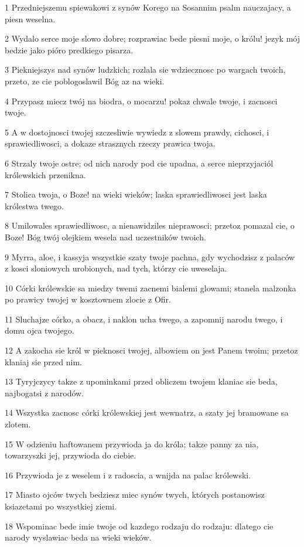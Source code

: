 \par 1 Przedniejszemu spiewakowi z synów Korego na Sosannim psalm nauczajacy, a piesn weselna.
\par 2 Wydalo serce moje slowo dobre; rozprawiac bede piesni moje, o królu! jezyk mój bedzie jako pióro predkiego pisarza.
\par 3 Piekniejszys nad synów ludzkich; rozlala sie wdziecznosc po wargach twoich, przeto, ze cie poblogoslawil Bóg az na wieki.
\par 4 Przypasz miecz twój na biodra, o mocarzu! pokaz chwale twoje, i zacnosci twoje.
\par 5 A w dostojnosci twojej szczesliwie wywiedz z slowem prawdy, cichosci, i sprawiedliwosci, a dokaze strasznych rzeczy prawica twoja.
\par 6 Strzaly twoje ostre; od nich narody pod cie upadna, a serce nieprzyjaciól królewskich przenikna.
\par 7 Stolica twoja, o Boze! na wieki wieków; laska sprawiedliwosci jest laska królestwa twego.
\par 8 Umilowales sprawiedliwosc, a nienawidziles nieprawosci; przetoz pomazal cie, o Boze! Bóg twój olejkiem wesela nad uczestników twoich.
\par 9 Myrra, aloe, i kassyja wszystkie szaty twoje pachna, gdy wychodzisz z palaców z kosci sloniowych urobionych, nad tych, którzy cie uweselaja.
\par 10 Córki królewskie sa miedzy twemi zacnemi bialemi glowami; stanela malzonka po prawicy twojej w kosztownem zlocie z Ofir.
\par 11 Sluchajze córko, a obacz, i naklon ucha twego, a zapomnij narodu twego, i domu ojca twojego.
\par 12 A zakocha sie król w pieknosci twojej, albowiem on jest Panem twoim; przetoz klaniaj sie przed nim.
\par 13 Tyryjczycy takze z upominkami przed obliczem twojem klaniac sie beda, najbogatsi z narodów.
\par 14 Wszystka zacnosc córki królewskiej jest wewnatrz, a szaty jej bramowane sa zlotem.
\par 15 W odzieniu haftowanem przywioda ja do króla; takze panny za nia, towarzyszki jej, przywioda do ciebie.
\par 16 Przywioda je z weselem i z radoscia, a wnijda na palac królewski.
\par 17 Miasto ojców twych bedziesz miec synów twych, których postanowisz ksiazetami po wszystkiej ziemi.
\par 18 Wspominac bede imie twoje od kazdego rodzaju do rodzaju: dlatego cie narody wyslawiac beda na wieki wieków.

